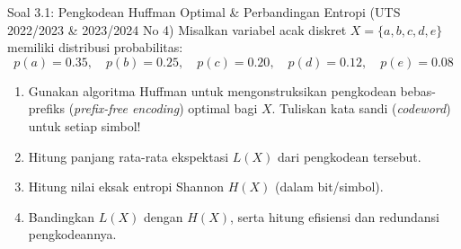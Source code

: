 \documentclass[11pt,a4paper]{article}
\begin{document}
\begin{soalbox}{Soal 3.1: Pengkodean Huffman Optimal \& Perbandingan Entropi (UTS 2022/2023 \& 2023/2024 No 4)}
Misalkan variabel acak diskret $X = \{a, b, c, d, e\}$ memiliki distribusi probabilitas:
\[
p(a) = 0.35, \quad p(b) = 0.25, \quad p(c) = 0.20, \quad p(d) = 0.12, \quad p(e) = 0.08
\]
\begin{enumerate}[label=(\alph*)]
    \item Gunakan algoritma Huffman untuk mengonstruksikan pengkodean bebas-prefiks (\textit{prefix-free encoding}) optimal bagi $X$. Tuliskan kata sandi (\textit{codeword}) untuk setiap simbol!
    \item Hitung panjang rata-rata ekspektasi $L(X)$ dari pengkodean tersebut.
    \item Hitung nilai eksak entropi Shannon $H(X)$ (dalam bit/simbol).
    \item Bandingkan $L(X)$ dengan $H(X)$, serta hitung efisiensi dan redundansi pengkodeannya.
\end{enumerate}
\end{soalbox}
\end{document}
